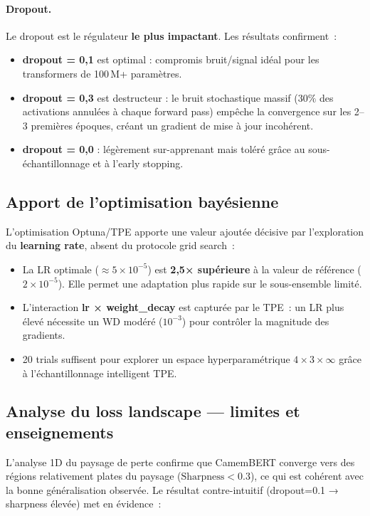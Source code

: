 \documentclass[12pt,a4paper]{article}
\begin{document}
\paragraph{Dropout.}
Le dropout est le régulateur \textbf{le plus impactant}. Les résultats confirment~:
\begin{itemize}
  \item \textbf{dropout = 0,1} est optimal : compromis bruit/signal idéal pour les
    transformers de 100\,M+ paramètres.
  \item \textbf{dropout = 0,3} est destructeur : le bruit stochastique massif
    ($30\%$ des activations annulées à chaque forward pass) empêche la convergence
    sur les 2--3 premières époques, créant un gradient de mise à jour incohérent.
  \item \textbf{dropout = 0,0} : légèrement sur-apprenant mais toléré grâce au
    sous-échantillonnage et à l'early stopping.
\end{itemize}

\subsection{Apport de l'optimisation bayésienne}
\label{ssec:apport_optuna}

L'optimisation Optuna/TPE apporte une valeur ajoutée décisive par l'exploration
du \textbf{learning rate}, absent du protocole grid search~:

\begin{itemize}
  \item La LR optimale ($\approx 5 \times 10^{-5}$) est \textbf{2,5× supérieure}
    à la valeur de référence ($2 \times 10^{-5}$). Elle permet une adaptation
    plus rapide sur le sous-ensemble limité.
  \item L'interaction \textbf{lr × weight\_decay} est capturée par le TPE~:
    un LR plus élevé nécessite un WD modéré ($10^{-3}$) pour contrôler la
    magnitude des gradients.
  \item 20 trials suffisent pour explorer un espace hyperparamétrique
    $4 \times 3 \times \infty$ grâce à l'échantillonnage intelligent TPE.
\end{itemize}

\subsection{Analyse du loss landscape — limites et enseignements}
\label{ssec:landscape_discussion}

L'analyse 1D du paysage de perte confirme que CamemBERT converge vers des
régions relativement plates du paysage ($\text{Sharpness} < 0.3$), ce qui
est cohérent avec la bonne généralisation observée. Le résultat contre-intuitif
(dropout=0.1 → sharpness élevée) met en évidence~:
\end{document}

